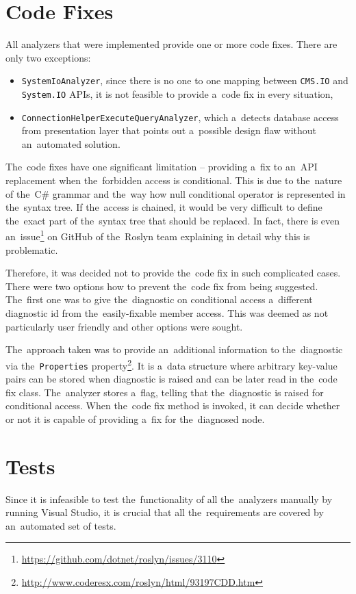 \documentclass[
  digital, %
  table,   %
  lof,     %
  lot,     %
  oneside,
]{fithesis3}
\begin{document}
\section{Code Fixes}
\label{sec:code-fixes}
All analyzers that were implemented provide one or more code fixes. There are only two exceptions:
\begin{itemize}
  \item \texttt{SystemIoAnalyzer}, since there is no one to one mapping between \texttt{CMS.IO} and \texttt{System.IO} APIs, it is not feasible to provide a~code fix in every situation,

  \item \texttt{ConnectionHelperExecuteQueryAnalyzer}, which a~detects database access from presentation layer that points out a~possible design flaw without an~automated solution.
\end{itemize} 

The~code fixes have one significant limitation -- providing a~fix to an~API replacement when the~forbidden access is conditional. This is due to the~nature of the~C\# grammar and the~way how null conditional operator is represented in the~syntax tree. If the~access is chained, it would be very difficult to define the~exact part of the~syntax tree that should be replaced. In fact, there is even an~issue\footnote{\url{https://github.com/dotnet/roslyn/issues/3110}} on GitHub of the~Roslyn team explaining in detail why this is problematic. 

Therefore, it was decided not to provide the~code fix in such complicated cases. There were two options how to prevent the~code fix from being suggested. The~first one was to give the~diagnostic on conditional access a~different diagnostic id from the~easily-fixable member access. This was deemed as not particularly user friendly and other options were sought.

The~approach taken was to provide an~additional information to the~diagnostic via the~\texttt{Properties} property\footnote{\url{http://www.coderesx.com/roslyn/html/93197CDD.htm}}. It is a~data structure where arbitrary key-value pairs can be stored when diagnostic is raised and can be later read in the~code fix class. The~analyzer stores a~flag, telling that the~diagnostic is raised for conditional access. When the~code fix method is invoked, it can decide whether or not it is capable of providing a~fix for the~diagnosed node.

\section{Tests}
Since it is infeasible to test the~functionality of all the~analyzers manually by running Visual Studio, it is crucial that all the~requirements are covered by an~automated set of tests. 
\end{document}
